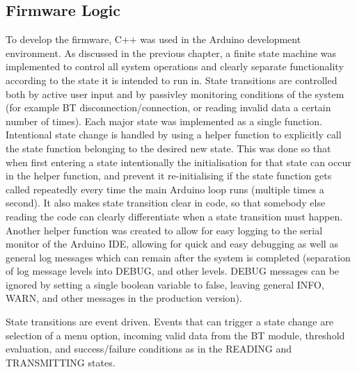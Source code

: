 \subsection{Firmware Logic}
To develop the firmware, C++ was used in the Arduino development environment. As discussed in the previous chapter, a finite state machine was implemented to control all system operations and clearly separate functionality according to the state it is intended to run in. State transitions are controlled both by active user input and by passivley monitoring conditions of the system (for example BT disconnection/connection, or reading invalid data a certain number of times). Each major state was implemented as a single function. Intentional state change is handled by using a helper function to explicitly call the state function belonging to the desired new state. This was done so that when first entering a state intentionally the initialisation for that state can occur in the helper function, and prevent it re-initialising if the state function gets called repeatedly every time the main Arduino loop runs (multiple times a second). It also makes state transition clear in code, so that somebody else reading the code can clearly differentiate when a state transition must happen. Another helper function was created to allow for easy logging to the serial monitor of the Arduino IDE, allowing for quick and easy debugging as well as general log messages which can remain after the system is completed (separation of log message levels into DEBUG, and other levels. DEBUG messages can be ignored by setting a single boolean variable to false, leaving general INFO, WARN, and other messages in the production version).

State transitions are event driven. Events that can trigger a state change are selection of a menu option, incoming valid data from the BT module, threshold evaluation, and success/failure conditions as in the READING and TRANSMITTING states.

